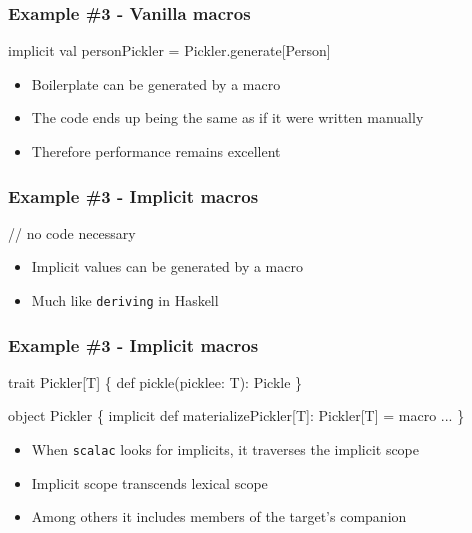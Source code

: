 \documentclass[svgnames,hyperref={bookmarks=false}]{beamer}
\begin{document}
\begin{frame}[fragile]
\frametitle{Example \#3 - Vanilla macros}

\begin{semiverbatim}
implicit val personPickler = Pickler\alert{.generate[}Person\alert{]}

\end{semiverbatim}

\begin{itemize}
\item Boilerplate can be generated by a macro
\item The code ends up being the same as if it were written manually
\item Therefore performance remains excellent
\end{itemize}
\end{frame}

\begin{frame}[fragile]
\frametitle{Example \#3 - Implicit macros}

\begin{semiverbatim}
// no code necessary

\end{semiverbatim}

\begin{itemize}
\item Implicit values can be generated by a macro
\item Much like \texttt{deriving} in Haskell
\end{itemize}
\end{frame}

\begin{frame}[fragile]
\frametitle{Example \#3 - Implicit macros}

\begin{semiverbatim}
trait Pickler[T] \{ def pickle(picklee: T): Pickle \}

object Pickler \{
  \alert{implicit def materializePickler[T]: Pickler[T] = macro ...}
\}

\end{semiverbatim}

\begin{itemize}
\item When \texttt{scalac} looks for implicits, it traverses the implicit scope
\item Implicit scope transcends lexical scope
\item Among others it includes members of the target's companion
\end{itemize}
\end{frame}
\end{document}
